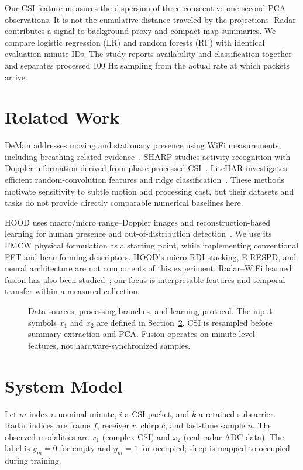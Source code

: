 \documentclass[conference,10pt,letterpaper]{IEEEtran}
\begin{document}
Our CSI feature measures the dispersion of three consecutive one-second PCA observations. It is not the cumulative distance traveled by the projections. Radar contributes a signal-to-background proxy and compact map summaries. We compare logistic regression (LR) and random forests (RF) with identical evaluation minute IDs. The study reports availability and classification together and separates processed 100 Hz sampling from the actual rate at which packets arrive.

\section{Related Work}
DeMan addresses moving and stationary presence using WiFi measurements, including breathing-related evidence~\cite{deman}. SHARP studies activity recognition with Doppler information derived from phase-processed CSI~\cite{sharp}. LiteHAR investigates efficient random-convolution features and ridge classification~\cite{litehar}. These methods motivate sensitivity to subtle motion and processing cost, but their datasets and tasks do not provide directly comparable numerical baselines here.

HOOD uses macro/micro range--Doppler images and reconstruction-based learning for human presence and out-of-distribution detection~\cite{hood}. We use its FMCW physical formulation as a starting point, while implementing conventional FFT and beamforming descriptors. HOOD's micro-RDI stacking, E-RESPD, and neural architecture are not components of this experiment. Radar--WiFi learned fusion has also been studied~\cite{fusion}; our focus is interpretable features and temporal transfer within a measured collection.

\begin{figure}[t]
\centering\resizebox{\textwidth}{!}{}
\caption{Data sources, processing branches, and learning protocol. The input symbols $x_1$ and $x_2$ are defined in Section~\ref{sec:model}. CSI is resampled before summary extraction and PCA. Fusion operates on minute-level features, not hardware-synchronized samples.}
\label{fig:overview}
\end{figure}

\section{System Model}\label{sec:model}
Let $m$ index a nominal minute, $i$ a CSI packet, and $k$ a retained subcarrier. Radar indices are frame $f$, receiver $r$, chirp $c$, and fast-time sample $n$. The observed modalities are $x_1$ (complex CSI) and $x_2$ (real radar ADC data). The label is $y_m=0$ for empty and $y_m=1$ for occupied; sleep is mapped to occupied during training.
\end{document}
